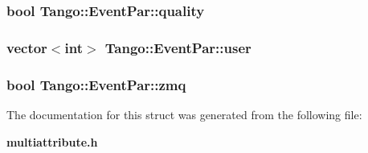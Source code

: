 \subsubsection[{quality}]{\setlength{\rightskip}{0pt plus 5cm}bool Tango\-::\-Event\-Par\-::quality}\label{structTango_1_1EventPar_a6d6102c967cc748de895ed3da36c9a37}
\subsubsection[{user}]{\setlength{\rightskip}{0pt plus 5cm}vector$<$int$>$ Tango\-::\-Event\-Par\-::user}\label{structTango_1_1EventPar_a3e7fa324cd3f29916061fb214ad44eeb}
\subsubsection[{zmq}]{\setlength{\rightskip}{0pt plus 5cm}bool Tango\-::\-Event\-Par\-::zmq}\label{structTango_1_1EventPar_a1b2ea6f3cab007a367c7317e1976d548}


The documentation for this struct was generated from the following file\-:\begin{DoxyCompactItemize}
\item 
{\bf multiattribute.\-h}\end{DoxyCompactItemize}
